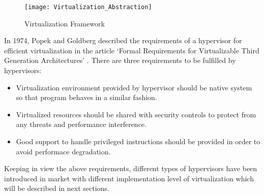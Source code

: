 \begin{figure}[htb]
\centering
\texttt{[image: Virtualization\_Abstraction]}
\caption{Virtualization Framework}
\label{Virtualization}
\end{figure}
In 1974, Popek and Goldberg described the requirements of a hypervisor for efficient virtualization in the article `Formal Requirements for Virtualizable Third Generation Architectures' \cite{popek_goldberg_1973}. There are three requirements to be fulfilled by hypervisors:
\begin{itemize}
	\item Virtualization environment provided by hypervisor should be native system so that program behaves in a similar fashion.
	\item Virtualized resources should be shared with security controls to protect from any threats and performance interference.
	\item Good support to handle privileged instructions should be provided in order to avoid performace degradation.
\end{itemize}
Keeping in view the above requirements, different types of hypervisors have been introduced in market with different implementation level of virtualization which will be described in next sections.

